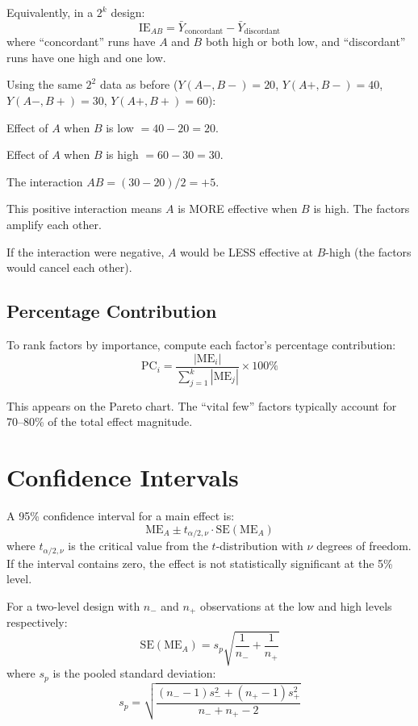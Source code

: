 \documentclass[11pt]{book}
\begin{document}
Equivalently, in a $2^k$ design:
\[
\text{IE}_{AB} = \bar{Y}_{\text{concordant}} - \bar{Y}_{\text{discordant}}
\]
where ``concordant'' runs have $A$ and $B$ both high or both low, and
``discordant'' runs have one high and one low.

\begin{example}
Using the same $2^2$ data as before ($Y(A{-}, B{-}) = 20$, $Y(A{+}, B{-}) = 40$,
$Y(A{-}, B{+}) = 30$, $Y(A{+}, B{+}) = 60$):

Effect of $A$ when $B$ is low $= 40 - 20 = 20$.

Effect of $A$ when $B$ is high $= 60 - 30 = 30$.

The interaction $AB = (30 - 20)/2 = +5$.

This positive interaction means $A$ is MORE effective when $B$ is high.
The factors amplify each other.

If the interaction were negative, $A$ would be LESS effective at $B$-high
(the factors would cancel each other).
\end{example}

\subsection{Percentage Contribution}

To rank factors by importance, compute each factor's percentage contribution:
\[
\text{PC}_i = \frac{|\text{ME}_i|}{\sum_{j=1}^{k} |\text{ME}_j|} \times 100\%
\]

This appears on the Pareto chart. The ``vital few'' factors typically account
for 70--80\% of the total effect magnitude.

\section{Confidence Intervals}

A 95\% confidence interval for a main effect is:
\[
\text{ME}_A \pm t_{\alpha/2, \nu} \cdot \text{SE}(\text{ME}_A)
\]
where $t_{\alpha/2, \nu}$ is the critical value from the $t$-distribution with
$\nu$ degrees of freedom. If the interval contains zero, the effect is not
statistically significant at the 5\% level.

For a two-level design with $n_-$ and $n_+$ observations at the low and high
levels respectively:
\[
\text{SE}(\text{ME}_A) = s_p \sqrt{\frac{1}{n_-} + \frac{1}{n_+}}
\]
where $s_p$ is the pooled standard deviation:
\[
s_p = \sqrt{\frac{(n_- - 1)s_-^2 + (n_+ - 1)s_+^2}{n_- + n_+ - 2}}
\]
\end{document}
